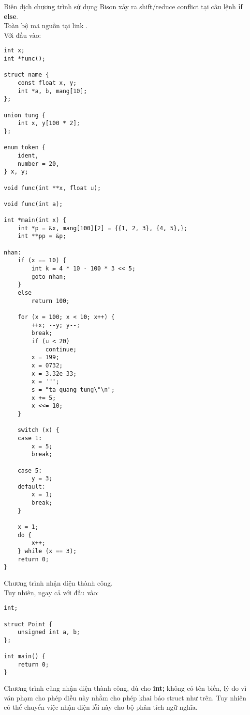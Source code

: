 \documentclass[../report.tex]{subfiles}
\begin{document}
Biên dịch chương trình sử dụng Bison xảy ra shift/reduce 
conflict tại câu lệnh \textbf{if else}. \\
Toàn bộ mã nguồn tại link \cite{source-code}. \\[3mm]
Với đầu vào: 
\begin{lstlisting}
int x;
int *func();

struct name {
    const float x, y;
    int *a, b, mang[10];
};

union tung {
    int x, y[100 * 2];
};

enum token {
    ident,
    number = 20,
} x, y;

void func(int **x, float u);

void func(int a);

int *main(int x) {
    int *p = &x, mang[100][2] = {{1, 2, 3}, {4, 5},};
    int **pp = &p;

nhan:
    if (x == 10) {
        int k = 4 * 10 - 100 * 3 << 5;
        goto nhan;
    }
    else
        return 100;

    for (x = 100; x < 10; x++) {
        ++x; --y; y--;
        break;
        if (u < 20)
            continue;
        x = 199;
        x = 0732;
        x = 3.32e-33;
        x = '"';
        s = "ta quang tung\"\n";
        x += 5;
        x <<= 10;
    }

    switch (x) {
    case 1:
        x = 5;
        break;

    case 5:
        y = 3;
    default:
        x = 1;
        break;
    }

    x = 1;
    do {
        x++;
    } while (x == 3);
    return 0;
}
\end{lstlisting}
Chương trình nhận diện thành công. \\[3mm]
Tuy nhiên, ngay cả với đầu vào:
\begin{lstlisting}
int;

struct Point {
    unsigned int a, b;
};

int main() {
    return 0;
}
\end{lstlisting}
Chương trình cũng nhận diện thành công, dù cho \textbf{int;}
không có tên biến, lý do vì văn phạm cho phép điều này nhằm 
cho phép khai báo struct như trên. Tuy nhiên có 
thể chuyển việc nhận diện 
lỗi này cho bộ phân tích ngữ nghĩa. 
\end{document}
